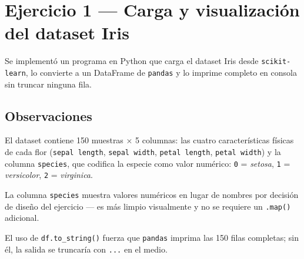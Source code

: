 \documentclass[../Main_Include.tex]{subfiles}
\begin{document}
%
%
%

\newcommand{\tituloinforme}{Área de Aplicación de la Inteligencia Artificial — Laboratorio 2}

\section{Ejercicio 1 — Carga y visualización del dataset Iris}

Se implementó un programa en Python que carga el dataset Iris desde
\texttt{scikit-learn}, lo convierte a un DataFrame de \texttt{pandas}
y lo imprime completo en consola sin truncar ninguna fila.

\subsection*{Observaciones}

El dataset contiene 150 muestras × 5 columnas: las cuatro características
físicas de cada flor (\texttt{sepal length}, \texttt{sepal width},
\texttt{petal length}, \texttt{petal width}) y la columna \texttt{species},
que codifica la especie como valor numérico: \texttt{0} = \emph{setosa},
\texttt{1} = \emph{versicolor}, \texttt{2} = \emph{virginica}.

La columna \texttt{species} muestra valores numéricos en lugar de nombres
por decisión de diseño del ejercicio --- es más limpio visualmente y
no se requiere un \texttt{.map()} adicional.

El uso de \texttt{df.to\_string()} fuerza que \texttt{pandas} imprima
las 150 filas completas; sin él, la salida se truncaría con \texttt{...}
en el medio.

\end{document}
